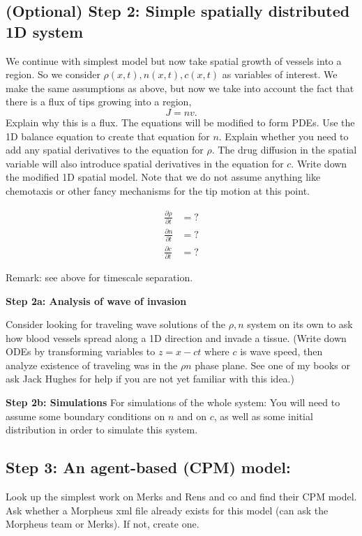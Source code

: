 \subsection{(Optional) Step 2: Simple spatially distributed 1D system}
We continue with simplest model but now take spatial growth of vessels into a region. So we consider $\rho(x,t), n(x,t), c(x,t)$ as variables of interest.
We make the same assumptions as above, but now we take into account the fact that there is a flux of tips growing into a region,
\[
J=nv.
\]
Explain why this is a flux.
The equations will be modified to form PDEs. Use the 1D balance equation to create that equation for $n$. Explain whether you need to add any spatial derivatives to the equation for $\rho$. The drug diffusion in the spatial variable will also introduce spatial derivatives in the equation for $c$. Write down the modified 1D spatial model. Note that we do not assume anything like chemotaxis or other fancy mechanisms for the tip motion at this point.

\begin{subequations}
\label{eq:SpatialtModel}
\begin{align}
\frac{\partial \rho}{\partial t }&= ?\\
\frac{\partial n}{\partial t }&= ?\\
\frac{\partial c}{\partial t }&= ?
\end{align}
\end{subequations}

Remark: see above for timescale separation.

\textbf{Step 2a: Analysis of wave of invasion}

Consider looking for traveling wave solutions of the $\rho,n$ system on its own to ask how blood vessels spread along a 1D direction and invade a tissue. (Write down ODEs by transforming variables to $z=x-ct$ where $c$ is wave speed, then analyze existence of traveling was in the $\rho n$ phase plane. See one of my books or ask Jack Hughes for help if you are not yet familiar with this idea.)


\textbf{Step 2b: Simulations}
For simulations of the whole system: You will need to assume some boundary conditions on $n$ and on $c$, as well as some initial distribution in order to simulate this system. 



\subsection{Step 3: An agent-based (CPM) model:}
Look up the simplest work on Merks and Rens and co and find their CPM model. Ask whether a Morpheus xml file already exists for this model (can ask the Morpheus team or Merks). If not, create one.


